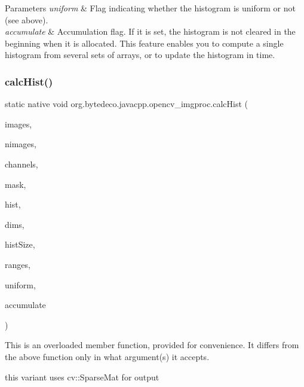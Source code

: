 \begin{DoxyParams}{Parameters}
\hline
{\em uniform} & Flag indicating whether the histogram is uniform or not (see above). \\
\hline
{\em accumulate} & Accumulation flag. If it is set, the histogram is not cleared in the beginning when it is allocated. This feature enables you to compute a single histogram from several sets of arrays, or to update the histogram in time. \\
\hline
\end{DoxyParams}
\mbox{\label{group__imgproc__hist_ga09dcede19ebb0d3cc41d719fa761849c}} 
\subsubsection{\texorpdfstring{calc\+Hist()}{calcHist()}\hspace{0.1cm}{\footnotesize\ttfamily [2/3]}}
{\footnotesize\ttfamily static native void org.\+bytedeco.\+javacpp.\+opencv\+\_\+imgproc.\+calc\+Hist (\begin{DoxyParamCaption}\item[{@Const Mat}]{images,  }\item[{int}]{nimages,  }\item[{@Const Int\+Pointer}]{channels,  }\item[{@By\+Val Mat}]{mask,  }\item[{@By\+Ref Sparse\+Mat}]{hist,  }\item[{int}]{dims,  }\item[{@Const Int\+Pointer}]{hist\+Size,  }\item[{@Cast(\char`\"{}const float$\ast$$\ast$\char`\"{}) Pointer\+Pointer}]{ranges,  }\item[{@Cast(\char`\"{}bool\char`\"{}) boolean}]{uniform,  }\item[{@Cast(\char`\"{}bool\char`\"{}) boolean}]{accumulate }\end{DoxyParamCaption})\hspace{0.3cm}{\ttfamily [static]}}

This is an overloaded member function, provided for convenience. It differs from the above function only in what argument(s) it accepts. 

this variant uses cv\+::\+Sparse\+Mat for output \mbox{\label{group__imgproc__hist_gaae5adf8a34c06197b68e79d8dcb9c9fd}} 
